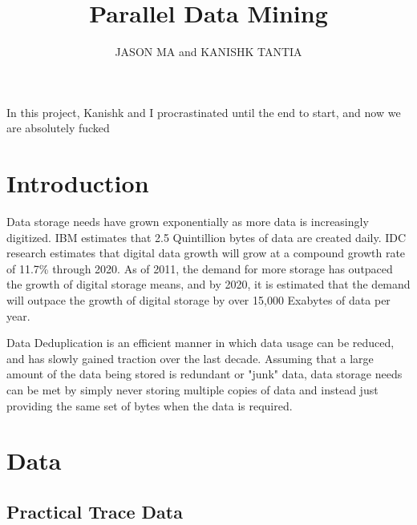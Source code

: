 \documentclass{acmtog} %
\begin{document}
	\title{Parallel Data Mining} %
	
	\author{JASON MA {\upshape and} KANISHK TANTIA
		}
	

	
	\maketitle
	In this project, Kanishk and I procrastinated until the end to start, and now we are absolutely fucked
	
	\section{Introduction}
	Data storage needs have grown exponentially as more data is increasingly digitized. IBM estimates that 2.5 Quintillion bytes of data are created daily. IDC research estimates that digital data growth will grow at a compound growth rate of 11.7\% through 2020. As of 2011, the demand for more storage has outpaced the growth of digital storage means, and by 2020, it is estimated that the demand will outpace the growth of digital storage by over 15,000 Exabytes of data per year. 
		
		Data Deduplication is an efficient manner in which data usage can be reduced, and has slowly gained traction over the last decade. Assuming that a large amount of the data being stored is redundant or "junk" data, data storage needs can be met by simply never storing multiple copies of data and instead just providing the same set of bytes when the data is required. 
		
	
	\section{Data}
	\subsection{Practical Trace Data}
\end{document}
